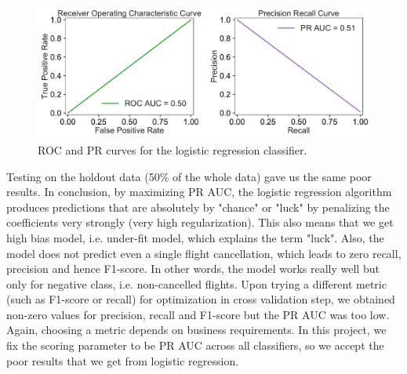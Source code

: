 \documentclass[12pt]{article}
\begin{document}
\begin{figure}[!h]
\begin{center}
\includegraphics[width=6in]{LR_ROC_PR_plots.pdf}
\end{center}
\caption{\label{fig:LR}
ROC and PR curves for the logistic regression classifier.}
\end{figure}
Testing on the holdout data (50$\%$ of the whole data) gave us the same poor results. In conclusion, by maximizing PR AUC, the logistic regression algorithm produces predictions that are absolutely by "chance" or "luck" by penalizing the coefficients very strongly (very high regularization). This also means that we get high bias model, i.e. under-fit model, which explains the term "luck". Also, the model does not predict even a single flight cancellation, which leads to zero recall, precision and hence F1-score. In other words, the model works really well but only for negative class, i.e. non-cancelled flights. Upon trying a different metric (such as F1-score or recall) for optimization in cross validation step, we obtained non-zero values for precision, recall and F1-score but the PR AUC was too low. Again, choosing a metric depends on business requirements. In this project, we fix the scoring parameter to be PR AUC across all classifiers, so we accept the poor results that we get from logistic regression.
\end{document}
